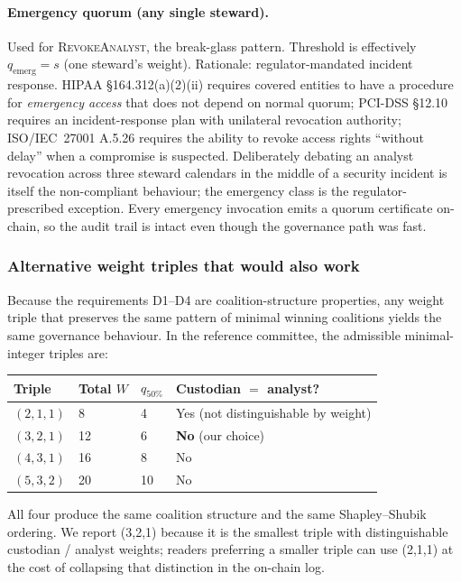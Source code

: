 \documentclass[10pt,twocolumn]{article}
\begin{document}
\paragraph{Emergency quorum (any single steward).}
Used for \textsc{RevokeAnalyst}, the break-glass pattern.
Threshold is effectively $q_{\text{emerg}} = s$ (one steward's
weight). Rationale: regulator-mandated incident response. HIPAA
\S164.312(a)(2)(ii) requires covered entities to have a procedure
for \emph{emergency access} that does not depend on normal
quorum; PCI-DSS \S12.10 requires an incident-response plan with
unilateral revocation authority; ISO/IEC~27001 A.5.26 requires
the ability to revoke access rights ``without delay'' when a
compromise is suspected. Deliberately debating an analyst
revocation across three steward calendars in the middle of a
security incident is itself the non-compliant behaviour; the
emergency class is the regulator-prescribed exception. Every
emergency invocation emits a quorum certificate on-chain, so the
audit trail is intact even though the governance path was fast.

\subsubsection{Alternative weight triples that would also work}
\label{sec:wqg-alternatives}

Because the requirements D1--D4 are coalition-structure properties,
any weight triple that preserves the same pattern of minimal
winning coalitions yields the same governance behaviour. In the
reference committee, the admissible minimal-integer triples are:

\begin{center}
\small
\begin{tabular}{@{}llll@{}}
\toprule
Triple & Total $W$ & $q_{50\%}$ & Custodian $=$ analyst? \\
\midrule
$(2,1,1)$ & 8  & 4 & Yes (not distinguishable by weight) \\
$(3,2,1)$ & 12 & 6 & \textbf{No} (our choice) \\
$(4,3,1)$ & 16 & 8 & No \\
$(5,3,2)$ & 20 & 10 & No \\
\bottomrule
\end{tabular}
\end{center}

All four produce the same coalition structure and the same
Shapley--Shubik ordering. We report (3,2,1) because it is the
smallest triple with distinguishable custodian / analyst weights;
readers preferring a smaller triple can use (2,1,1) at the cost
of collapsing that distinction in the on-chain log.
\end{document}
